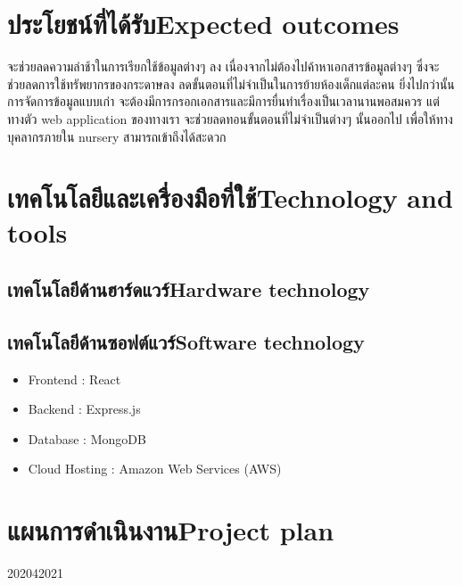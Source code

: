 \section{\ifcpe ประโยชน์ที่ได้รับ\else Expected outcomes\fi}
จะช่วยลดความล่าช้าในการเรียกใช้ข้อมูลต่างๆ ลง    
  เนื่องจากไม่ต้องไปค้าหาเอกสารข้อมูลต่างๆ ซึ่งจะช่วยลดการใช้ทรัพยากรของกระดาษลง  ลดขั้นตอนที่ไม่จำเป็นในการย้ายห้องเด็กแต่ละคน ยิ่งไปกว่านั้นการจัดการข้อมูลแบบเก่า  จะต้องมีการกรอกเอกสารและมีการยื่นทำเรื่องเป็นเวลานานพอสมควร แต่ทางตัว web application ของทางเรา จะช่วยลดทอนขั้นตอนที่ไม่จำเป็นต่างๆ นั้นออกไป เพื่อให้ทางบุคลากรภายใน nursery สามารถเข้าถึงได้สะดวก

\section{\ifcpe เทคโนโลยีและเครื่องมือที่ใช้\else Technology and tools\fi}

\subsection{\ifcpe เทคโนโลยีด้านฮาร์ดแวร์\else Hardware technology\fi}

\subsection{\ifcpe เทคโนโลยีด้านซอฟต์แวร์\else Software technology\fi}
\begin{itemize}
    \item Frontend : React 	
    \item Backend : Express.js 
    \item Database : MongoDB
    \item Cloud Hosting : Amazon Web Services (AWS)
\end{itemize}



\section{\ifcpe แผนการดำเนินงาน\else Project plan\fi}

\begin{plan}{11}{2020}{4}{2021}
\end{plan}

